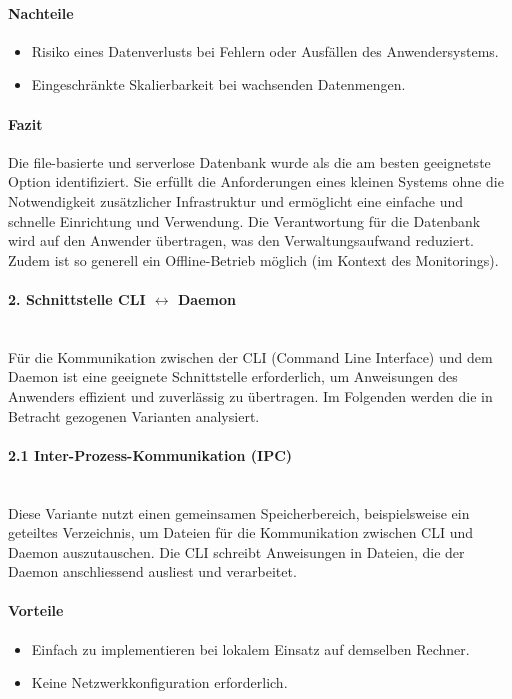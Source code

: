 \documentclass[a4paper,12pt]{report}
\begin{document}
    \paragraph*{Nachteile}
    \begin{itemize}
        \item Risiko eines Datenverlusts bei Fehlern oder Ausfällen des Anwendersystems.
        \item Eingeschränkte Skalierbarkeit bei wachsenden Datenmengen.
    \end{itemize}

    \paragraph*{Fazit}
    Die file-basierte und serverlose Datenbank wurde als die am besten geeignetste Option identifiziert.
    Sie erfüllt die Anforderungen eines kleinen Systems ohne die Notwendigkeit zusätzlicher Infrastruktur und ermöglicht eine einfache und schnelle Einrichtung und Verwendung.
    Die Verantwortung für die Datenbank wird auf den Anwender übertragen, was den Verwaltungsaufwand reduziert.
    Zudem ist so generell ein Offline-Betrieb möglich (im Kontext des Monitorings).

    \paragraph*{2. Schnittstelle CLI $\leftrightarrow$ Daemon}\mbox{}\\
    Für die Kommunikation zwischen der CLI (Command Line Interface) und dem Daemon ist eine geeignete Schnittstelle erforderlich, um Anweisungen des Anwenders effizient und zuverlässig zu übertragen.
    Im Folgenden werden die in Betracht gezogenen Varianten analysiert.

    \paragraph*{2.1 Inter-Prozess-Kommunikation (IPC)}\mbox{}\\
    Diese Variante nutzt einen gemeinsamen Speicherbereich, beispielsweise ein geteiltes Verzeichnis, um Dateien für die Kommunikation zwischen CLI und Daemon auszutauschen.
    Die CLI schreibt Anweisungen in Dateien, die der Daemon anschliessend ausliest und verarbeitet.

    \paragraph*{Vorteile}
    \begin{itemize}
        \item Einfach zu implementieren bei lokalem Einsatz auf demselben Rechner.
        \item Keine Netzwerkkonfiguration erforderlich.
    \end{itemize}
\end{document}

